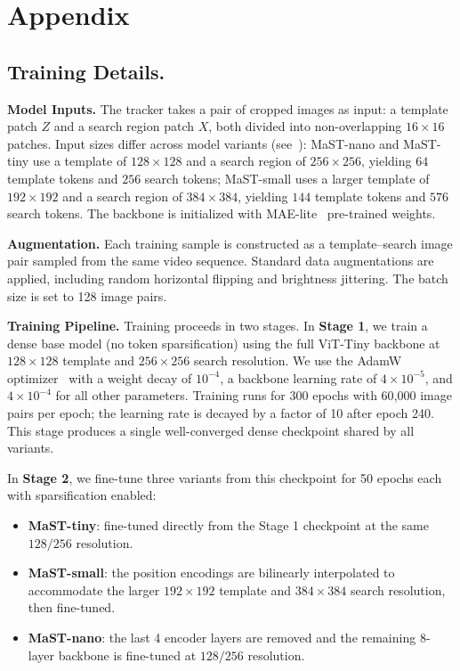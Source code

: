 \appendix

\section{Appendix}



\subsection{Training Details.}

\textbf{Model Inputs.}
The tracker takes a pair of cropped images as input: a template patch $Z$ and a search region patch $X$, both divided into non-overlapping $16 \times 16$ patches.
Input sizes differ across model variants (see~): MaST-nano and MaST-tiny use a template of $128 \times 128$ and a search region of $256 \times 256$, yielding $64$ template tokens and $256$ search tokens; MaST-small uses a larger template of $192 \times 192$ and a search region of $384 \times 384$, yielding $144$ template tokens and $576$ search tokens.
The backbone is initialized with MAE-lite~\cite{wang2023maelite} pre-trained weights.

\textbf{Augmentation.}
Each training sample is constructed as a template–search image pair sampled from the same video sequence.
Standard data augmentations are applied, including random horizontal flipping and brightness jittering.
The batch size is set to 128 image pairs.

\textbf{Training Pipeline.}
Training proceeds in two stages.
In \textbf{Stage 1}, we train a dense base model (no token sparsification) using the full ViT-Tiny backbone at $128\times128$ template and $256\times256$ search resolution.
We use the AdamW optimizer~\cite{adamw} with a weight decay of $10^{-4}$, a backbone learning rate of $4 \times 10^{-5}$, and $4 \times 10^{-4}$ for all other parameters.
Training runs for 300 epochs with 60{,}000 image pairs per epoch; the learning rate is decayed by a factor of 10 after epoch 240.
This stage produces a single well-converged dense checkpoint shared by all variants.

In \textbf{Stage 2}, we fine-tune three variants from this checkpoint for 50 epochs each with sparsification enabled:
\begin{itemize}
  \item \textbf{MaST-tiny}: fine-tuned directly from the Stage 1 checkpoint at the same $128/256$ resolution.
  \item \textbf{MaST-small}: the position encodings are bilinearly interpolated to accommodate the larger $192\times192$ template and $384\times384$ search resolution, then fine-tuned.
  \item \textbf{MaST-nano}: the last 4 encoder layers are removed and the remaining 8-layer backbone is fine-tuned at $128/256$ resolution.
\end{itemize}

